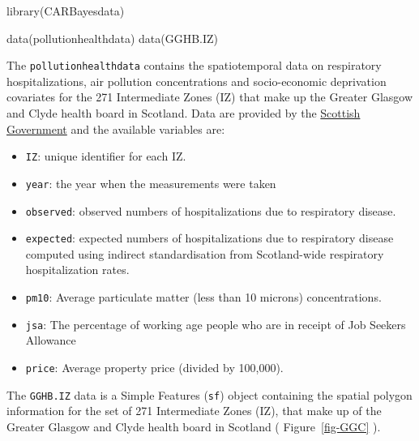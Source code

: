 \documentclass[
  letterpaper,
  DIV=11,
  numbers=noendperiod]{scrartcl}
\newenvironment{Shaded}{\begin{snugshade}}{\end{snugshade}}
\newcommand{\FunctionTok}[1]{\textcolor[rgb]{0.28,0.35,0.67}{#1}}
\newcommand{\NormalTok}[1]{\textcolor[rgb]{0.00,0.23,0.31}{#1}}
\providecommand{\tightlist}{%
  \setlength{\itemsep}{0pt}\setlength{\parskip}{0pt}}\usepackage{longtable,booktabs,array}
\begin{document}
\begin{Shaded}
\begin{Highlighting}[]
\FunctionTok{library}\NormalTok{(CARBayesdata)}

\FunctionTok{data}\NormalTok{(pollutionhealthdata)}
\FunctionTok{data}\NormalTok{(GGHB.IZ)}
\end{Highlighting}
\end{Shaded}

The \texttt{pollutionhealthdata} contains the spatiotemporal data on
respiratory hospitalizations, air pollution concentrations and
socio-economic deprivation covariates for the 271 Intermediate Zones
(IZ) that make up the Greater Glasgow and Clyde health board in
Scotland. Data are provided by the
\href{http://statistics.gov.scot.}{Scottish Government} and the
available variables are:

\begin{itemize}
\tightlist
\item
  \texttt{IZ}: unique identifier for each IZ.
\item
  \texttt{year}: the year when the measurements were taken
\item
  \texttt{observed}: observed numbers of hospitalizations due to
  respiratory disease.
\item
  \texttt{expected}: expected numbers of hospitalizations due to
  respiratory disease computed using indirect standardisation from
  Scotland-wide respiratory hospitalization rates.
\item
  \texttt{pm10}: Average particulate matter (less than 10 microns)
  concentrations.
\item
  \texttt{jsa}: The percentage of working age people who are in receipt
  of Job Seekers Allowance
\item
  \texttt{price}: Average property price (divided by 100,000).
\end{itemize}

The \texttt{GGHB.IZ} data is a Simple Features (\texttt{sf}) object
containing the spatial polygon information for the set of 271
Intermediate Zones (IZ), that make up of the Greater Glasgow and Clyde
health board in Scotland ( Figure~\ref{fig-GGC} ).
\end{document}
